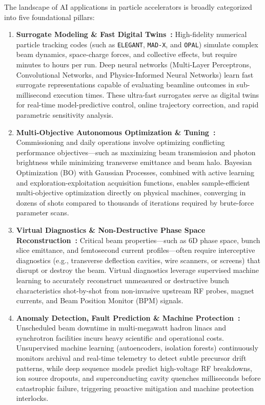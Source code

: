 \documentclass[11pt,a4paper]{article}
\begin{document}
The landscape of AI applications in particle accelerators is broadly categorized into five foundational pillars:
\begin{enumerate}
    \item \textbf{Surrogate Modeling \& Fast Digital Twins~\cite{edelen2020opportunities, edelen2018neural}:}
    High-fidelity numerical particle tracking codes (such as \texttt{ELEGANT}, \texttt{MAD-X}, and \texttt{OPAL}) simulate complex beam dynamics, space-charge forces, and collective effects, but require minutes to hours per run. Deep neural networks (Multi-Layer Perceptrons, Convolutional Networks, and Physics-Informed Neural Networks) learn fast surrogate representations capable of evaluating beamline outcomes in sub-millisecond execution times. These ultra-fast surrogates serve as digital twins for real-time model-predictive control, online trajectory correction, and rapid parametric sensitivity analysis.

    \item \textbf{Multi-Objective Autonomous Optimization \& Tuning~\cite{roussel2023turnkey, edelen2020machine}:}
    Commissioning and daily operations involve optimizing conflicting performance objectives---such as maximizing beam transmission and photon brightness while minimizing transverse emittance and beam halo. Bayesian Optimization (BO) with Gaussian Processes, combined with active learning and exploration-exploitation acquisition functions, enables sample-efficient multi-objective optimization directly on physical machines, converging in dozens of shots compared to thousands of iterations required by brute-force parameter scans.

    \item \textbf{Virtual Diagnostics \& Non-Destructive Phase Space Reconstruction~\cite{emma2021virtual}:}
    Critical beam properties---such as 6D phase space, bunch slice emittance, and femtosecond current profiles---often require interceptive diagnostics (e.g., transverse deflection cavities, wire scanners, or screens) that disrupt or destroy the beam. Virtual diagnostics leverage supervised machine learning to accurately reconstruct unmeasured or destructive bunch characteristics shot-by-shot from non-invasive upstream RF probes, magnet currents, and Beam Position Monitor (BPM) signals.

    \item \textbf{Anomaly Detection, Fault Prediction \& Machine Protection~\cite{tennant2020supervised}:}
    Unscheduled beam downtime in multi-megawatt hadron linacs and synchrotron facilities incurs heavy scientific and operational costs. Unsupervised machine learning (autoencoders, isolation forests) continuously monitors archival and real-time telemetry to detect subtle precursor drift patterns, while deep sequence models predict high-voltage RF breakdowns, ion source dropouts, and superconducting cavity quenches milliseconds before catastrophic failure, triggering proactive mitigation and machine protection interlocks.


\end{enumerate}
\end{document}
